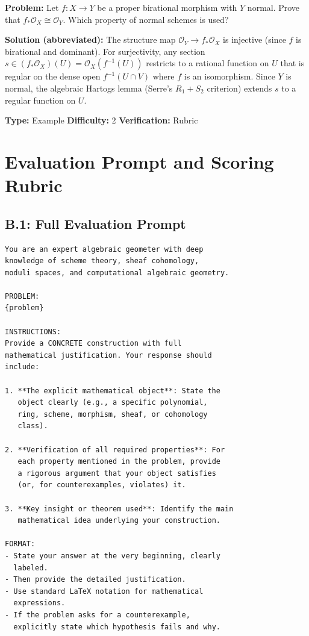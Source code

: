 \begin{problembox}[title={\ecagid{0019} --- Basic Concepts}]
\textbf{Problem:} Let $f: X \to Y$ be a proper birational morphism with $Y$ normal. Prove that $f_* \mathcal{O}_X \cong \mathcal{O}_Y$. Which property of normal schemes is used?

\medskip
\textbf{Solution (abbreviated):}
The structure map $\mathcal{O}_Y \to f_* \mathcal{O}_X$ is injective (since $f$ is birational and dominant).
For surjectivity, any section $s \in (f_* \mathcal{O}_X)(U) = \mathcal{O}_X(f^{-1}(U))$ restricts to a rational function on $U$ that is regular on the dense open $f^{-1}(U \cap V)$ where $f$ is an isomorphism.
Since $Y$ is normal, the algebraic Hartogs lemma (Serre's $R_1 + S_2$ criterion) extends $s$ to a regular function on $U$.

\medskip
\textbf{Type:} Example \quad \textbf{Difficulty:} 2 \quad \textbf{Verification:} Rubric
\end{problembox}

\section{Evaluation Prompt and Scoring Rubric}
\label{app:prompt}

\subsection*{B.1: Full Evaluation Prompt}

\begin{lstlisting}
You are an expert algebraic geometer with deep
knowledge of scheme theory, sheaf cohomology,
moduli spaces, and computational algebraic geometry.

PROBLEM:
{problem}

INSTRUCTIONS:
Provide a CONCRETE construction with full
mathematical justification. Your response should
include:

1. **The explicit mathematical object**: State the
   object clearly (e.g., a specific polynomial,
   ring, scheme, morphism, sheaf, or cohomology
   class).

2. **Verification of all required properties**: For
   each property mentioned in the problem, provide
   a rigorous argument that your object satisfies
   (or, for counterexamples, violates) it.

3. **Key insight or theorem used**: Identify the main
   mathematical idea underlying your construction.

FORMAT:
- State your answer at the very beginning, clearly
  labeled.
- Then provide the detailed justification.
- Use standard LaTeX notation for mathematical
  expressions.
- If the problem asks for a counterexample,
  explicitly state which hypothesis fails and why.
\end{lstlisting}

